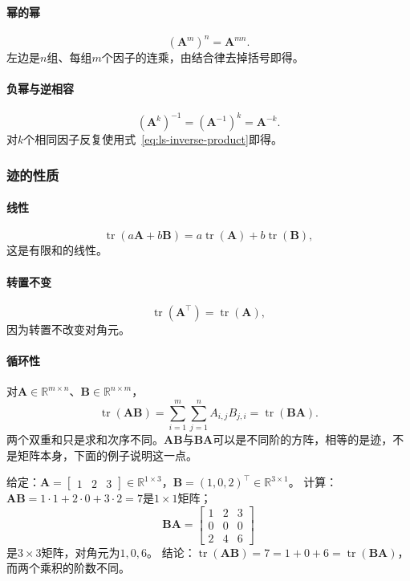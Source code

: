 \paragraph{幂的幂}
\[
 (\bm A^m)^n=\bm A^{mn}.
\]
左边是$n$组、每组$m$个因子的连乘，由结合律去掉括号即得。

\paragraph{负幂与逆相容}
\[
 (\bm A^k)^{-1}=(\bm A^{-1})^k=\bm A^{-k}.
\]
对$k$个相同因子反复使用式~\eqref{eq:ls-inverse-product}即得。

\subsubsection{迹的性质}
\label{sec:ls-matrix-contractions}

\paragraph{线性}
\[
 \operatorname{tr}(a\bm A+b\bm B)=a\operatorname{tr}(\bm A)+b\operatorname{tr}(\bm B),
\]
这是有限和的线性。

\paragraph{转置不变}
\[
 \operatorname{tr}(\bm A^\top)=\operatorname{tr}(\bm A),
\]
因为转置不改变对角元。

\paragraph{循环性}
对$\bm A\in\mathbb R^{m\times n}$、$\bm B\in\mathbb R^{n\times m}$，
\begin{equation}
 \operatorname{tr}(\bm A\bm B)
 =\sum_{i=1}^m\sum_{j=1}^n A_{i,j}B_{j,i}
 =\operatorname{tr}(\bm B\bm A).
 \label{eq:linear-algebra-trace-cyclic}
\end{equation}
两个双重和只是求和次序不同。$\bm A\bm B$与$\bm B\bm A$可以是不同阶的方阵，相等的是迹，不是矩阵本身，下面的例子说明这一点。
\begin{example}[不同阶乘积的迹相等]
\label{ex:ls-trace-cyclic-different-sizes}
给定：$\bm A=\left[\begin{smallmatrix}1&2&3\end{smallmatrix}\right]\in\mathbb R^{1\times3}$，$\bm B=(1,0,2)^\top\in\mathbb R^{3\times1}$。
计算：$\bm A\bm B=1\cdot1+2\cdot0+3\cdot2=7$是$1\times1$矩阵；
\[
 \bm B\bm A=\begin{bmatrix}1&2&3\\0&0&0\\2&4&6\end{bmatrix}
\]
是$3\times3$矩阵，对角元为$1,0,6$。
结论：$\operatorname{tr}(\bm A\bm B)=7=1+0+6=\operatorname{tr}(\bm B\bm A)$，而两个乘积的阶数不同。
\end{example}

